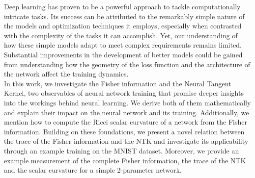 Deep learning has proven to be a powerful approach to tackle computationally intricate tasks. Its success can be attributed to the remarkably simple nature of the models and optimization techniques it employs, especially when contrasted with the complexity of the tasks it can accomplish. Yet, our understanding of how these simple models adapt to meet complex requirements remains limited. Substantial improvements in the development of better models could be gained from understanding how the geometry of the loss function and the architecture of the network affect the training dynamics.\\
In this work, we investigate the Fisher information and the Neural Tangent Kernel, two observables of neural network training that promise deeper insights into the workings behind neural learning. We derive both of them mathematically and explain their impact on the neural network and its training. Additionally, we mention how to compute the Ricci scalar curvature of a network from the Fisher information. Building on these foundations, we present a novel relation between the trace of the Fisher information and the NTK and investigate its applicability through an example training on the MNIST dataset. Moreover, we provide an example measurement of the complete Fisher information, the trace of the NTK and the scalar curvature for a simple 2-parameter network.